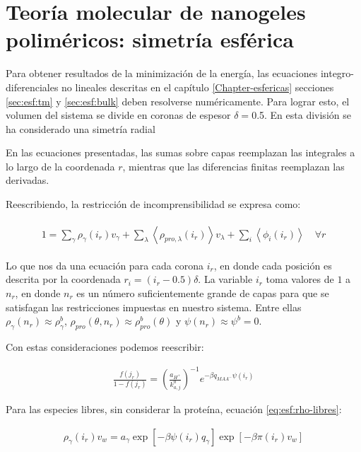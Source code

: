 \section{Teor\'ia molecular de nanogeles polim\'ericos: simetr\'ia esf\'erica}


Para obtener resultados de la minimizaci\'on de la energ\'ia, las ecuaciones integro-diferenciales no lineales descritas en el cap\'itulo \ref{Chapter-esfericas} secciones \ref{sec:esf:tm} y \ref{sec:esf:bulk} deben resolverse num\'ericamente. Para lograr esto, el volumen del sistema se divide en coronas de espesor $\delta = $0.5. En esta divisi\'on se ha considerado una simetr\'ia radial 

En las ecuaciones presentadas, las sumas sobre capas reemplazan las integrales a lo largo de la coordenada $r$, mientras que las diferencias finitas reemplazan las derivadas.

Reescribiendo, la restricci\'on de incomprensibilidad se expresa como:

\begin{align}
	\begin{aligned}
		1=  {\sum_{\gamma}\rho_\gamma(i_r) v_\gamma + \sum_\lambda{\left<\rho_{pro,\lambda}(i_r)\right>v_\lambda} + \sum_i{\left<\phi_i(i_r)\right>}} \quad \forall r
		\label{eq:esf:pi-ir}
	\end{aligned}
\end{align}

Lo que nos da una ecuaci\'on para cada corona $i_r$, en donde cada posici\'on es descrita por la coordenada $r_i = (i_r -0.5)\delta$. 
La variable $i_r$ toma valores de $1$ a $n_r$, en donde $n_r$ es un n\'umero suficientemente grande de capas para que se satisfagan las restricciones impuestas en nuestro sistema. Entre ellas
$\rho_\gamma(n_r) \approx \rho_\gamma^b$, $\rho_{pro}(\theta,n_r) \approx \rho_{pro}^b(\theta)$ y $\psi(n_r) \approx \psi^b = 0$.

Con estas consideraciones podemos reescribir:


\begin{align}
	\frac{f(j_r)}{1-f(j_r)}= \left(\frac{a_{H^+}}{k^0_{a,j}}\right)^{-1} e^{-\beta q_{MAA^-}\psi(i_r)}
\end{align}


Para las especies libres, sin considerar la prote\'ina, ecuaci\'on \ref{eq:esf:rho-libres}:

\begin{align}
	\rho_\gamma(i_r)v_w = a_\gamma \exp{[-\beta \psi(i_r)q_\gamma]} \exp{[-\beta\pi(i_r) v_w]}
\end{align}

